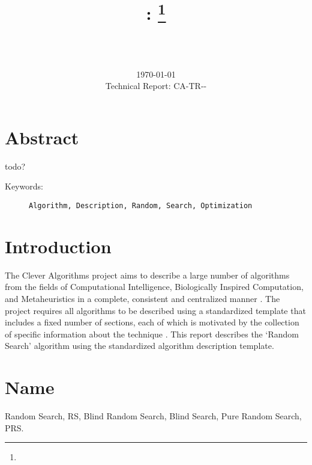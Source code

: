 \documentclass[a4paper, 11pt]{article}
\title{{\myreporttitle}: {\myreportsubtitle}\footnote{\myreportlicense}}
\author{\myreportauthor\\{\myreportemail}\\\small\myreportproject}
\date{\today\\{\small{Technical Report: CA-TR-{\myreportdate}-\myreportversion}}}
\begin{document}
\maketitle

\section*{Abstract} 
todo?

\begin{description}
	\item[Keywords:] {\small\texttt{Algorithm, Description, Random, Search, Optimization}}
\end{description} 

\section{Introduction} 
\label{sec:intro}
The Clever Algorithms project aims to describe a large number of algorithms from the fields of Computational Intelligence, Biologically Inspired Computation, and Metaheuristics in a complete, consistent and centralized manner \cite{Brownlee2010}.
The project requires all algorithms to be described using a standardized template that includes a fixed number of sections, each of which is motivated by the collection of specific information about the technique \cite{Brownlee2010a}.
This report describes the `Random Search' algorithm using the standardized algorithm description template. 

\section{Name} 
\label{sec:name}
Random Search, RS, Blind Random Search, Blind Search, Pure Random Search, PRS.

\end{document}
